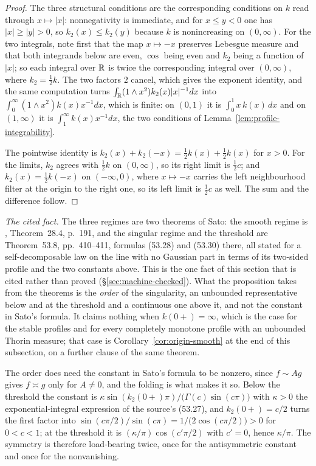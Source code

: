 \begin{proof}
The three structural conditions are the corresponding conditions on $k$ read through
$x \mapsto |x|$: nonnegativity is immediate, and for $x \le y < 0$ one has $|x| \ge |y| > 0$, so
$k_2(x) \le k_2(y)$ because $k$ is nonincreasing on $(0,\infty)$. For the two integrals, note
first that the map $x \mapsto -x$ preserves Lebesgue measure and that both integrands below are
even, $\cos$ being even and $k_2$ being a function of $|x|$; so each integral over $\mathbb{R}$ is
twice the corresponding integral over $(0,\infty)$, where $k_2 = \tfrac12 k$. The two factors
$2$ cancel, which gives the exponent identity, and the same computation turns
$\int_{\mathbb{R}} (1 \wedge x^2)k_2(x)|x|^{-1}dx$ into $\int_0^\infty (1 \wedge x^2)k(x)x^{-1}dx$, which
is finite: on $(0,1)$ it is $\int_0^1 x\,k(x)\,dx$ and on $(1,\infty)$ it is
$\int_1^\infty k(x)x^{-1}dx$, the two conditions of Lemma~\ref{lem:profile-integrability}.

The pointwise identity is $k_2(x) + k_2(-x) = \tfrac12 k(x) + \tfrac12 k(x)$ for $x > 0$. For the
limits, $k_2$ agrees with $\tfrac12 k$ on $(0,\infty)$, so its right limit is $\tfrac12 c$; and
$k_2(x) = \tfrac12 k(-x)$ on $(-\infty,0)$, where $x \mapsto -x$ carries the left neighbourhood
filter at the origin to the right one, so its left limit is $\tfrac12 c$ as well. The sum and
the difference follow.
\end{proof}

\emph{The cited fact.} The three regimes are two theorems of Sato: the smooth regime is
, Theorem~28.4, p.~191, and the singular regime and the threshold are
Theorem~53.8, pp.~410--411, formulas (53.28) and (53.30) there, all stated for a
self-decomposable law on the line with no Gaussian part in terms of its two-sided profile and
the two constants above. This is the one fact of this section that is cited rather than
proved (\S\ref{sec:machine-checked}). What the proposition takes from the theorems is the
\emph{order} of the singularity, an unbounded representative below and at the threshold and
a continuous one above it, and not the constant in Sato's formula. It claims nothing when
$k(0{+}) = \infty$, which is the case for the stable profiles and for every completely
monotone profile with an unbounded Thorin measure; that case is
Corollary~\ref{cor:origin-smooth} at the end of this subsection, on a further clause of the same
theorem.

The order does need the constant in Sato's formula to be nonzero, since $f \sim Ag$ gives
$f \asymp g$ only for $A \ne 0$, and the folding is what makes it so. Below the threshold the
constant is $\kappa\sin(k_2(0{+})\pi)/\bigl(\Gamma(c)\sin(c\pi)\bigr)$ with $\kappa > 0$ the
exponential-integral expression of the source's (53.27), and $k_2(0{+}) = c/2$ turns the first
factor into $\sin(c\pi/2)/\sin(c\pi) = 1/\bigl(2\cos(c\pi/2)\bigr) > 0$ for $0 < c < 1$; at the
threshold it is $(\kappa/\pi)\cos(c'\pi/2)$ with $c' = 0$, hence $\kappa/\pi$. The symmetry is
therefore load-bearing twice, once for the antisymmetric constant and once for the nonvanishing.

